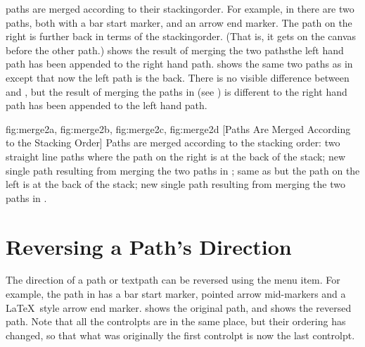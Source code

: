 \Glspl{path} are merged according to their \gls{stackingorder}. For
example, in  there are two \glspl{path}, both
with a bar start marker, and an arrow end marker. The path on the
right is further back in terms of the \gls{stackingorder}. (That is,
it gets  on the \gls{canvas} before the
other path.)  shows the result of merging the
two paths\dash the left hand path has been appended to the right
hand path.  shows the same two paths as in
 except that now the left path is the
\gls{back}. There is no visible difference between
 and , but the result
of merging the paths in  (see
) is different to
\dash the right hand path has been appended
to the left hand path.

{
  {fig:merge2a}{}{},
  {fig:merge2b}{}{},
  {fig:merge2c}{}{},
  {fig:merge2d}{}{}
}
[Paths Are Merged According to the Stacking Order]
{Paths are merged according to the stacking order:
 two straight line paths where the path 
on the right is at the back of the stack;
 new single path resulting from merging 
the two paths in ;
 same as  but the path on the left
is at the back of the stack;
 new single path resulting from merging 
the two paths in .}


\section{Reversing a Path's Direction}\label{sec:reversing}


The direction of a \gls{path} or \gls{textpath} can be reversed
using the  menu item. For example, the path
in  has a bar start marker, pointed arrow
mid-markers and a \LaTeX\ style arrow end marker.
 shows the original path, and
 shows the reversed path. Note that all the
\glspl{controlpt} are in the same place, but their ordering has
changed, so that what was originally the first \gls{controlpt} is
now the last \gls{controlpt}.

